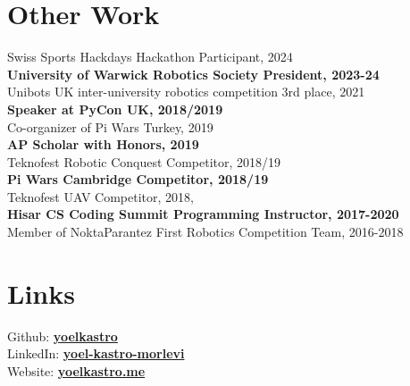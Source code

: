 \documentclass{deedy-resume-reversed}
\begin{document}
\begin{minipage}[t]{0.33\textwidth}


\section{Other Work}
Swiss Sports Hackdays Hackathon Participant, 2024 \\
\textbf{University of Warwick Robotics Society President, 2023-24} \\
Unibots UK inter-university robotics competition 3rd place, 2021 \\
\textbf{Speaker at PyCon UK, 2018/2019} \\
Co-organizer of Pi Wars Turkey, 2019 \\
\textbf{AP Scholar with Honors, 2019} \\
Teknofest Robotic Conquest Competitor, 2018/19 \\
\textbf{Pi Wars Cambridge Competitor, 2018/19} \\ 
Teknofest UAV Competitor, 2018, \\
\textbf{Hisar CS Coding Summit Programming Instructor, 2017-2020} \\
Member of NoktaParantez First Robotics Competition Team, 2016-2018 \\
\sectionsep


\section{Links}
Github: \href{https://github.com/yoelkastro}{\bf yoelkastro} \\
LinkedIn:  \href{https://www.linkedin.com/in/yoel-kastro-morlevi}{\bf yoel-kastro-morlevi} \\
Website: \href{https://www.yoelkastro.me}{\bf yoelkastro.me}
\sectionsep

\end{minipage}
\end{document}
